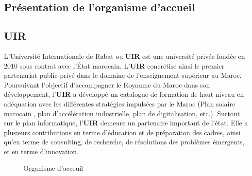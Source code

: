 \documentclass[a4paper]{report}
\begin{document}
\begin{doublespace}
	\section{Présentation de l’organisme d’accueil}
	\subsection{UIR}

	L’Université Internationale de Rabat ou \textbf{UIR} est une université
	privée fondée en 2010 sous contrat avec l’État marocain.
	L'\textbf{UIR} concrétise ainsi le premier partenariat public-privé dans le
	domaine de l'enseignement supérieur au Maroc.
	Poursuivant l'objectif d'accompagner le Royaume du Maroc dans son
	développement, l'\textbf{UIR} a développé un catalogue
	de formation de haut niveau en adéquation avec les différentes stratégies
	impulsées par le Maroc (Plan solaire marocain
	, plan d'accélération industrielle, plan de digitalisation, etc.). Surtout
	sur le plan informatique, l'\textbf{UIR} demeure
	un partenaire important de l'état. Elle a plusieurs contributions en terme
	d'éducation et de préparation des cadres, ainsi
	qu'en terme de consulting, de recherche, de résolutions des problèmes
	émergents, et en terme d’innovation.
	\begin{figure}[H]
		\begin{center}
			\caption{Organisme d'acceuil}
		\end{center}
	\end{figure}

\end{doublespace}
\end{document}
